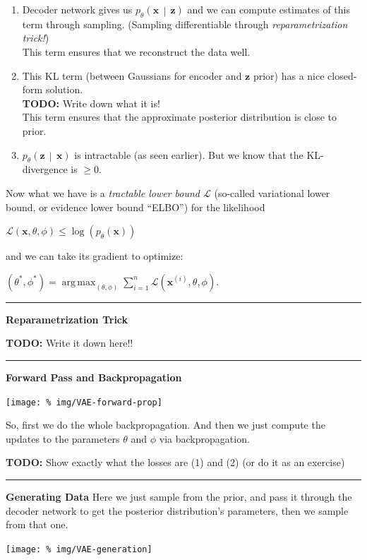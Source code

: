 \documentclass[a2paper,8pt]{extarticle}
\newcommand{\tcb}[1]{\textcolor{lighttext}{#1}}
\newcommand{\tcb}[1]{\textcolor{blue}{#1}}
\newcommand{\cL}{\mathcal{L}}
\newcommand{\cDist}[3]{#1\left( #2 \,\middle|\, #3 \right)}
\DeclareMathOperator*{\argmax}{arg\,max}
\renewcommand{\vec}[1]{\mathbf{#1}}
\newcommand{\vx}{\vec{x}}
\newcommand{\vz}{\vec{z}}
\newcommand{\todo}[1]{\textbf{TODO:} #1}
\newcommand{\todo}[1]{%
}
\newcommand{\sep}{\vspace{0pt}\noindent\hrule\vspace{0pt}}
\newcommand{\sep}{\vspace{5pt}\noindent\hrule\vspace{5pt}}
\begin{document}
\begin{landscape}
\begin{multicols*}{7}
\begin{enumerate}[label=(\arabic*)]
  \item Decoder network gives us $\cDist{p_\theta}{\vx}{\vz}$ and we can compute
  estimates of this term through sampling. (Sampling differentiable through
  \emph{reparametrization trick!})\\
  This term ensures that we reconstruct the data well.
  \item This KL term (between Gaussians for encoder and $\vz$ prior) has a nice
  closed-form solution.\\
  \todo{Write down what it is!}\\
  This term ensures that the approximate posterior distribution is close to
  prior.
  \item $\cDist{p_\theta}{\vz}{\vx}$ is intractable (as seen earlier). But we
  know that the KL-divergence is $\geq 0$.
\end{enumerate}

Now what we have is a \emph{tractable lower bound $\cL$} (so-called
\tcb{variational lower bound, or evidence lower bound ``ELBO''}) for the
likelihood

$
\cL(\vx,\theta,\phi)\leq \log(p_\theta(\vx))
$

and we can take its gradient to optimize:

$
(\theta^*,\phi^*)=\argmax_{(\theta,\phi)}\sum_{i=1}^n\cL(\vx^{(i)},\theta,\phi).
$

\sep

\textbf{Reparametrization Trick}

\todo{Write it down here!!}

\sep

\textbf{Forward Pass and Backpropagation}

\begin{center}
  \texttt{[image: \%
img/VAE-forward-prop]}
\end{center}

So, first we do the whole backpropagation. And then we just compute the updates
to the parameters $\theta$ and $\phi$ via backpropagation.

\todo{Show exactly what the losses are (1) and (2) (or do it as an exercise)}

\sep

\textbf{Generating Data} Here we just sample from the prior, and pass it through
the decoder network to get the posterior distribution's parameters, then we
sample from that one.

\begin{center}
  \texttt{[image: \%
img/VAE-generation]}
\end{center}


\end{multicols*}
\end{landscape}
\end{document}
